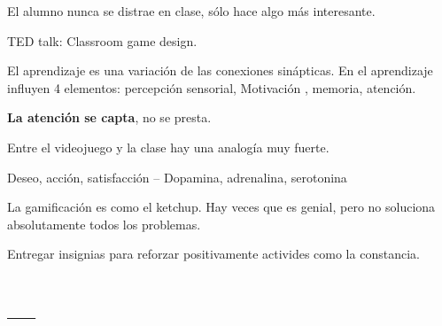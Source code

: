 \documentclass[palatino]{apuntes}
\begin{document}
El alumno nunca se distrae en clase, sólo hace algo más interesante.

TED talk: Classroom game design.

El aprendizaje es una variación de las conexiones sinápticas.
En el aprendizaje influyen 4 elementos: percepción sensorial, Motivación , memoria, atención. 

\textbf{La atención se capta}, no se presta.


Entre el videojuego y la clase hay una analogía muy fuerte. 

\begin{defn}[DAS]
Deseo, acción, satisfacción -- Dopamina, adrenalina, serotonina
\end{defn}


La gamificación es como el ketchup. Hay veces que es genial, pero no soluciona absolutamente todos los problemas.

Entregar insignias  para reforzar positivamente activides como la constancia.

\appendix

\chapter{---}


\printindex
\end{document}
